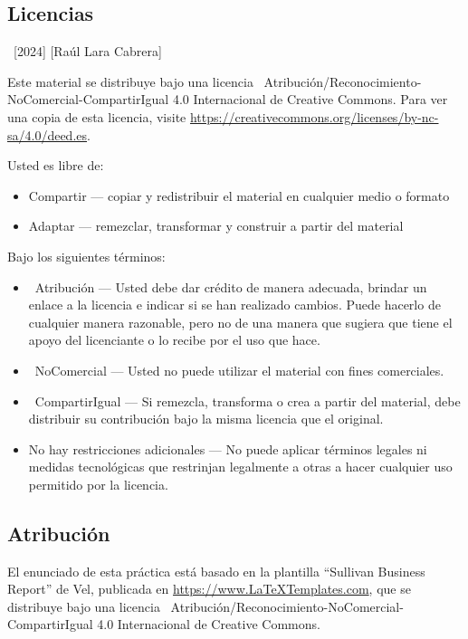 \documentclass[
    a4paper, %
    12pt, %
]{CSSullivanBusinessReport}
\begin{document}
\begin{twothirdswidth} %
    \footnotesize %
    
    \subsection*{Licencias}
    
    \textcopyright~[2024] [Raúl Lara Cabrera] 
    
    Este material se distribuye bajo una licencia \ccbyncsaeu~Atribución/Reconocimiento-NoComercial-CompartirIgual 4.0 Internacional de Creative Commons. Para ver una copia de esta licencia, visite \url{https://creativecommons.org/licenses/by-nc-sa/4.0/deed.es}. 
    
    Usted es libre de:
    \begin{itemize}
        \item Compartir — copiar y redistribuir el material en cualquier medio o formato
        \item Adaptar — remezclar, transformar y construir a partir del material
    \end{itemize}
    Bajo los siguientes términos:
    \begin{itemize}
        \item \ccAttribution~Atribución — Usted debe dar crédito de manera adecuada, brindar un enlace a la licencia e indicar si se han realizado cambios. Puede hacerlo de cualquier manera razonable, pero no de una manera que sugiera que tiene el apoyo del licenciante o lo recibe por el uso que hace.
        \item \ccNonCommercialEU~NoComercial — Usted no puede utilizar el material con fines comerciales.
        \item \ccShareAlike~CompartirIgual — Si remezcla, transforma o crea a partir del material, debe distribuir su contribución bajo la misma licencia que el original.
        \item No hay restricciones adicionales — No puede aplicar términos legales ni medidas tecnológicas que restrinjan legalmente a otras a hacer cualquier uso permitido por la licencia.
    \end{itemize}

    \subsection*{Atribución}

    El enunciado de esta práctica está basado en la plantilla ``Sullivan Business Report'' de Vel, publicada en \url{https://www.LaTeXTemplates.com}, que se distribuye bajo una licencia \ccbyncsaeu~Atribución/Reconocimiento-NoComercial-CompartirIgual 4.0 Internacional de Creative Commons.
    

\end{twothirdswidth}
\end{document}
